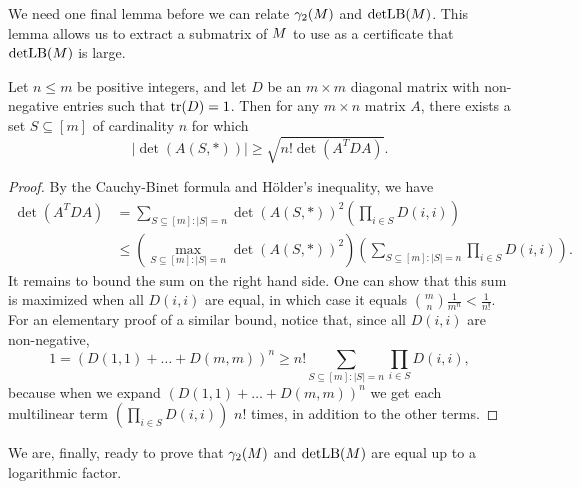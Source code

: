 We need one final lemma before we can relate $\gamma_2(M)$ and
$\operatorname{detLB}(M)$. This lemma  allows us to extract a submatrix of
$M$ to use as a certificate that $\operatorname{detLB}(M)$ is large. 

\begin{lemma}\label{lm:ch7-submatrix}
  Let $n\le m$ be positive integers, and let $D$ be an $m\times m$ diagonal matrix with non-negative entries such that $\operatorname{tr}(D) =
  1$. Then for any $m\times n$ matrix $A$, there exists a set
  $S\subseteq [m]$ of cardinality $n$ for which 
  \[
    |\det(A(S,*))| \ge  \sqrt{n!\det(A^TDA)}.
  \]
\end{lemma}
\begin{proof}
  By the Cauchy-Binet formula and H\"older's inequality, we have
  \begin{align*}
    \det(A^T DA) %
                 &= \sum_{S\subseteq [m]: |S| = n}  \det(A(S,*))^2 \left(\prod_{i \in S} D(i,i)\right)\\
                 &\le \left(\max_{S \subseteq [m]: |S| = n}\det(A(S,*))^2\right)
                   \left(\sum_{S\subseteq [m]: |S| = n} \prod_{i \in S} D(i,i)\right).
  \end{align*}
  It remains to bound the sum on the right hand side. One can show that this sum is maximized when all $D(i,i)$ are equal,
  in which case it equals ${m \choose n} \frac{1}{m^n} <
  \frac{1}{n!}$. For an elementary proof of a similar bound,
  notice that, since all $D(i,i)$ are non-negative,
  \[
    1 = (D(1,1) + \ldots + D(m,m))^n
    \ge n! \sum_{S\subseteq [m]: |S| = n} \prod_{i \in S} D(i,i),
  \]
  because when we expand $(D(1,1) + \ldots + D(m,m))^n$ we get each
  multilinear term $\left(\prod_{i \in S} D(i,i)\right)$ $n!$ times,
  in addition to the other terms. %
\end{proof}

We are, finally, ready to prove that $\gamma_2(M)$ and
$\operatorname{detLB}(M)$ are equal up to a logarithmic factor.

